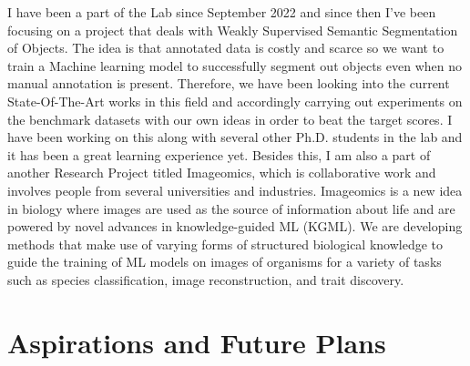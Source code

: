 \documentclass[11pt]{article}
\begin{document}
I have been a part of the Lab since September 2022 and since then I've been focusing on a project that deals with Weakly Supervised Semantic Segmentation of Objects. The idea is that annotated data is costly and scarce so we want to train a Machine learning model to successfully segment out objects even when no manual annotation is present. Therefore, we have been looking into the current State-Of-The-Art works in this field and accordingly carrying out experiments on the benchmark datasets with our own ideas in order to beat the target scores. I have been working on this along with several other Ph.D. students in the lab and it has been a great learning experience yet. Besides this, I am also a part of another Research Project titled Imageomics, which is collaborative work and involves people from several universities and industries.  Imageomics is a new idea in biology where images are used as the source of information about life and are powered by novel advances in knowledge-guided ML (KGML). We are developing methods that make use of varying forms of structured biological knowledge to guide the training of ML models on images of organisms for a variety of tasks such as species classification, image reconstruction, and trait discovery.

\section{Aspirations and Future Plans}
\end{document}
